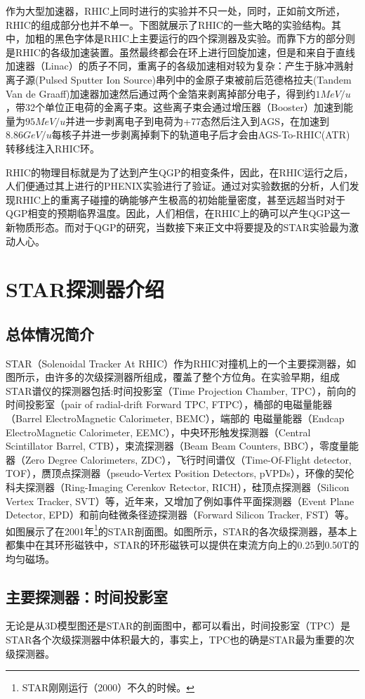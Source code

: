 \documentclass[%
 reprint,
 amsmath,amssymb,
 aps,
]{revtex4-1}
\begin{document}
作为大型加速器，RHIC上同时进行的实验并不只一处，同时，正如前文所述，RHIC的组成部分也并不单一。下图就展示了RHIC的一些大略的实验结构。其中，加粗的黑色字体是RHIC上主要运行的四个探测器及实验。而靠下方的部分则是RHIC的各级加速装置。虽然最终都会在环上进行回旋加速，但是和来自于直线加速器（Linac）的质子不同，重离子的各级加速相对较为复杂：产生于脉冲溅射离子源(Pulsed Sputter Ion Source)串列中的金原子束被前后范德格拉夫(Tandem Van de Graaff)加速器加速然后通过两个金箔来剥离掉部分电子，得到约$1\si{MeV/u}$，带32个单位正电荷的金离子束。这些离子束会通过增压器（Booster）加速到能量为$95\si{MeV/u}$并进一步剥离电子到电荷为+77态然后注入到AGS，在加速到$8.86\si{GeV/u}$每核子并进一步剥离掉剩下的轨道电子后才会由AGS-To-RHIC(ATR)转移线注入RHIC环。

RHIC的物理目标就是为了达到产生QGP的相变条件，因此，在RHIC运行之后，人们便通过其上进行的PHENIX实验进行了验证。通过对实验数据的分析，人们发现RHIC上的重离子碰撞的确能够产生极高的初始能量密度，甚至远超当时对于QGP相变的预期临界温度。因此，人们相信，在RHIC上的确可以产生QGP这一新物质形态。而对于QGP的研究，当数接下来正文中将要提及的STAR实验最为激动人心。
\section{\label{sec:STAR}STAR探测器介绍}
\subsection{\label{sec:staroverview}总体情况简介}
STAR（Solenoidal Tracker At RHIC）作为RHIC对撞机上的一个主要探测器，如图所示，由许多的次级探测器所组成，覆盖了整个方位角。在实验早期，组成STAR谱仪的探测器包括:时间投影室（Time Projection Chamber, TPC），前向的时间投影室（pair of radial-drift Forward TPC, FTPC），桶部的电磁量能器（Barrel ElectroMagnetic Calorimeter, BEMC），端部的 电磁量能器（Endcap ElectroMagnetic Calorimeter, EEMC），中央环形触发探测器（Central Scintillator Barrel, CTB），束流探测器（Beam Beam Counters, BBC），零度量能器（Zero Degree Calorimeters, ZDC），飞行时间谱仪（Time-Of-Flight detector, TOF），赝顶点探测器（pseudo-Vertex Position Detectors, pVPDs），环像的契伦科夫探测器（Ring-Imaging Cerenkov Retector, RICH），硅顶点探测器（Silicon Vertex Tracker, SVT）等，近年来，又增加了例如事件平面探测器（Event Plane Detector, EPD）和前向硅微条径迹探测器（Forward Silicon Tracker, FST）等。如图展示了在2001年\footnote{STAR刚刚运行（2000）不久的时候。}的STAR剖面图。如图所示，STAR的各次级探测器，基本上都集中在其环形磁铁中，STAR的环形磁铁可以提供在束流方向上的0.25到0.50T的均匀磁场。
\subsection{\label{sec:TPC}主要探测器：时间投影室}
无论是从3D模型图还是STAR的剖面图中，都可以看出，时间投影室（TPC）是STAR各个次级探测器中体积最大的，事实上，TPC也的确是STAR最为重要的次级探测器。
\end{document}
